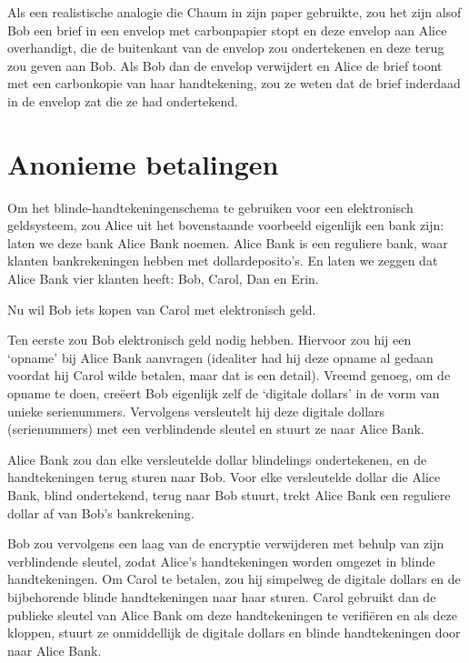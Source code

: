 \documentclass[smalldemyvopaper,11pt,twoside,onecolumn,openright,extrafontsizes,hidelinks]{memoir}
\begin{document}
Als een realistische analogie die Chaum in zijn paper gebruikte, zou het
zijn alsof Bob een brief in een envelop met carbonpapier stopt en deze
envelop aan Alice overhandigt, die de buitenkant van de envelop zou
ondertekenen en deze terug zou geven aan Bob. Als Bob dan de envelop
verwijdert en Alice de brief toont met een carbonkopie van haar
handtekening, zou ze weten dat de brief inderdaad in de envelop zat die
ze had ondertekend.

\section{Anonieme betalingen}\label{anonieme-betalingen}

Om het blinde-handtekeningenschema te gebruiken voor een elektronisch
geldsysteem, zou Alice uit het bovenstaande voorbeeld eigenlijk een bank
zijn: laten we deze bank Alice Bank noemen. Alice Bank is een reguliere
bank, waar klanten bankrekeningen hebben met dollardeposito's. En laten
we zeggen dat Alice Bank vier klanten heeft: Bob, Carol, Dan en Erin.

Nu wil Bob iets kopen van Carol met elektronisch geld.

Ten eerste zou Bob elektronisch geld nodig hebben. Hiervoor zou hij een
`opname' bij Alice Bank aanvragen (idealiter had hij deze opname al
gedaan voordat hij Carol wilde betalen, maar dat is een detail). Vreemd
genoeg, om de opname te doen, creëert Bob eigenlijk zelf de `digitale
dollars' in de vorm van unieke serienummers. Vervolgens versleutelt hij
deze digitale dollars (serienummers) met een verblindende sleutel en
stuurt ze naar Alice Bank.

Alice Bank zou dan elke versleutelde dollar blindelings ondertekenen, en
de handtekeningen terug sturen naar Bob. Voor elke versleutelde dollar
die Alice Bank, blind ondertekend, terug naar Bob stuurt, trekt Alice
Bank een reguliere dollar af van Bob's bankrekening.

Bob zou vervolgens een laag van de encryptie verwijderen met behulp van
zijn verblindende sleutel, zodat Alice's handtekeningen worden omgezet
in blinde handtekeningen. Om Carol te betalen, zou hij simpelweg de
digitale dollars en de bijbehorende blinde handtekeningen naar haar
sturen. Carol gebruikt dan de publieke sleutel van Alice Bank om deze
handtekeningen te verifiëren en als deze kloppen, stuurt ze onmiddellijk
de digitale dollars en blinde handtekeningen door naar Alice Bank.
\end{document}

